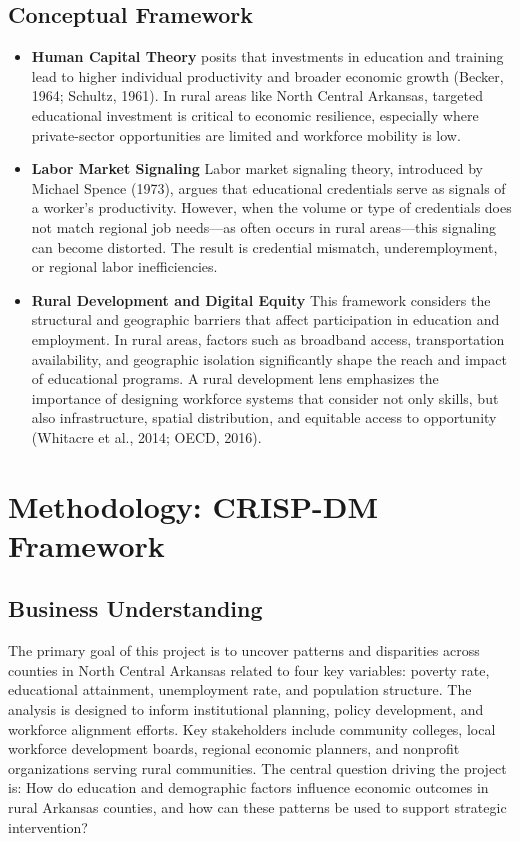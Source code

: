 \documentclass[12pt]{llncs}
\begin{document}
\subsection{Conceptual Framework}
\begin{itemize}
  \item \textbf{Human Capital Theory} posits that investments in education and training lead to higher individual productivity and broader economic growth (Becker, 1964; Schultz, 1961). In rural areas like North Central Arkansas, targeted educational investment is critical to economic resilience, especially where private-sector opportunities are limited and workforce mobility is low.
  \item \textbf{Labor Market Signaling} Labor market signaling theory, introduced by Michael Spence (1973), argues that educational credentials serve as signals of a worker's productivity. However, when the volume or type of credentials does not match regional job needs—as often occurs in rural areas—this signaling can become distorted. The result is credential mismatch, underemployment, or regional labor inefficiencies.
  \item \textbf{Rural Development and Digital Equity} This framework considers the structural and geographic barriers that affect participation in education and employment. In rural areas, factors such as broadband access, transportation availability, and geographic isolation significantly shape the reach and impact of educational programs. A rural development lens emphasizes the importance of designing workforce systems that consider not only skills, but also infrastructure, spatial distribution, and equitable access to opportunity (Whitacre et al., 2014; OECD, 2016).
\end{itemize}

\section{Methodology: CRISP-DM Framework}
\subsection{Business Understanding}
The primary goal of this project is to uncover patterns and disparities across counties in North Central Arkansas related to four key variables: poverty rate, educational attainment, unemployment rate, and population structure. The analysis is designed to inform institutional planning, policy development, and workforce alignment efforts. Key stakeholders include community colleges, local workforce development boards, regional economic planners, and nonprofit organizations serving rural communities. The central question driving the project is: How do education and demographic factors influence economic outcomes in rural Arkansas counties, and how can these patterns be used to support strategic intervention?
\end{document}
